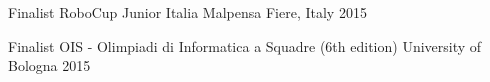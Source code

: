 
\begin{cvhonors}

  \cvhonor
    {Finalist}
    {RoboCup Junior Italia}
    {Malpensa Fiere, Italy}
    {2015}

  \cvhonor
    {Finalist}
    {OIS - Olimpiadi di Informatica a Squadre (6th edition)}
    {University of Bologna}
    {2015}

\end{cvhonors}
